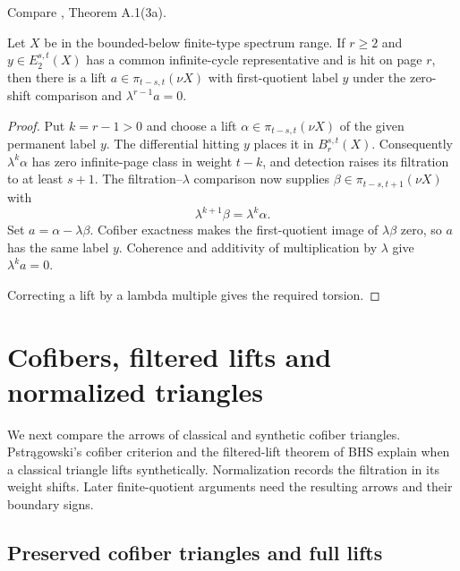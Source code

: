 \begin{theorem}
\label{sem:Literature:complete-boundary-lift}
Compare \cite{BHS}, Theorem A.1(3a).\par

Let $X$ be in the bounded-below finite-type spectrum range. If $r\ge2$
and $y\in E_2^{s,t}(X)$ has a common infinite-cycle representative
and is hit on page $r$, then there is a lift
$a\in\pi_{t-s,t}(\nu X)$ with first-quotient label $y$ under the
zero-shift comparison and $\lambda^{r-1}a=0$.

\end{theorem}
\begin{proof}
Put $k=r-1>0$ and choose a lift
$\alpha\in\pi_{t-s,t}(\nu X)$ of the given permanent label $y$.
The differential hitting $y$ places it in $B_r^{s,t}(X)$.
Consequently $\lambda^k\alpha$ has zero infinite-page class in
weight $t-k$, and detection raises its filtration to at least $s+1$.
The filtration--$\lambda$ comparison now supplies
$\beta\in\pi_{t-s,t+1}(\nu X)$ with
\[
\lambda^{k+1}\beta=\lambda^k\alpha.
\]
Set $a=\alpha-\lambda\beta$. Cofiber exactness makes the
first-quotient image of $\lambda\beta$ zero, so $a$ has the same
label $y$. Coherence and additivity of multiplication by $\lambda$
give $\lambda^k a=0$.

Correcting a lift by a lambda multiple gives the required torsion.
\end{proof}


\section{Cofibers, filtered lifts and normalized triangles}
We next compare the arrows of classical and synthetic cofiber triangles.
Pstr\k{a}gowski's cofiber criterion and the filtered-lift theorem of BHS
explain when a classical triangle lifts synthetically. Normalization
records the filtration in its weight shifts. Later finite-quotient
arguments need the resulting arrows and their boundary signs.

\subsection{Preserved cofiber triangles and full lifts}

